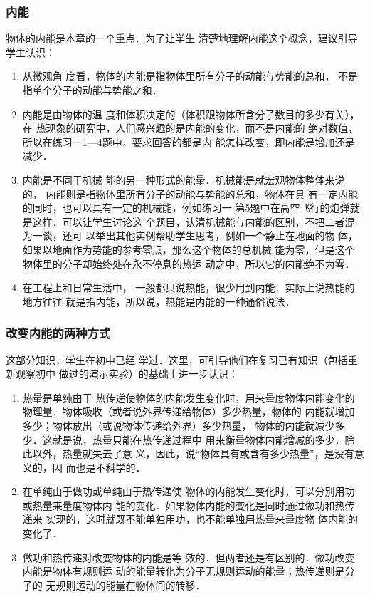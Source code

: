 \subsubsection{内能}

物体的内能是本章的一个重点．为了让学生
清楚地理解内能这个概念，建议引导学生认识：
\begin{enumerate}
\item 从微观角
度看，物体的内能是指物体里所有分子的动能与势能的总和，
不是指单个分子的动能与势能之和．   
 \item 内能是由物体的温
度和体积决定的（体积跟物体所含分子数目的多少有关），在
热现象的研究中，人们感兴趣的是内能的变化，而不是内能的
绝对数值，所以在练习一1—4题中，要求回答的都是内
能怎样改变，即内能是增加还是减少．   
 \item 内能是不同于机械
能的另一种形式的能量．机械能是就宏观物体整体来说的，
内能则是指物体里所有分子的动能与势能的总和，物体在具
有一定内能的同时，也可以具有一定的机械能，例如练习一
第5题中在高空飞行的炮弹就是这样．可以让学生讨论这
个题目，认清机械能与内能的区别，不把二者混为一谈，还可
以举出其他实例帮助学生思考，例如一个静止在地面的物
体，如果以地面作为势能的参考零点，那么这个物体的总机械
能为零，但是这个物体里的分子却始终处在永不停息的热运
动之中，所以它的内能绝不为零． 
\item 在工程上和日常生活中，
一般都只说热能，很少用到内能．实际上说热能的地方往往
就是指内能，所以说，热能是内能的一种通俗说法．
\end{enumerate}

\subsubsection{改变内能的两种方式} 这部分知识，学生在初中已经
学过．这里，可引导他们在复习已有知识（包括重新观察初中
做过的演示实验）的基础上进一步认识：
\begin{enumerate}
\item 热量是单纯由于
热传递使物体的内能发生变化时，用来量度物体内能变化的
物理量．物体吸收（或者说外界传递给物体）多少热量，物体的
内能就增加多少；物体放出（或说物体传递给外界）多少热量，
物体的内能就减少多少．这就是说，热量只能在热传递过程中
用来衡量物体内能增减的多少．除此以外，热量就失去了意
义，因此，说“物体具有或含有多少热量”，是没有意义的，因
而也是不科学的．    \item 在单纯由于做功或单纯由于热传递使
物体的内能发生变化时，可以分别用功或热量来量度物体内
能的变化．如果物体内能的变化是同时通过做功和热传递来
实现的，这时就既不能单独用功，也不能单独用热量来量度物
体内能的变化了．    \item 做功和热传递对改变物体的内能是等
效的．但两者还是有区别的．做功改变内能是物体有规则运
动的能量转化为分子无规则运动的能量；热传递则是分子的
无规则运动的能量在物体间的转移．
\end{enumerate}

